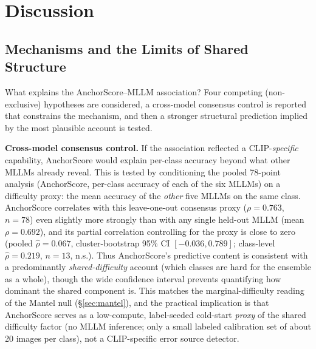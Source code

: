 \documentclass[11pt,a4paper]{article}
\begin{document}
\section{Discussion}
\label{sec:discussion}

\subsection{Mechanisms and the Limits of Shared Structure}
\label{sec:consensus_control}
\label{sec:mechanisms}

What explains the AnchorScore--MLLM association? Four competing (non-exclusive) hypotheses are considered, a cross-model consensus control is reported that constrains the mechanism, and then a stronger structural prediction implied by the most plausible account is tested.

\textbf{Cross-model consensus control.} If the association reflected a CLIP-\emph{specific} capability, AnchorScore would explain per-class accuracy beyond what other MLLMs already reveal. This is tested by conditioning the pooled 78-point analysis (AnchorScore, per-class accuracy of each of the six MLLMs) on a difficulty proxy: the mean accuracy of the \emph{other} five MLLMs on the same class. AnchorScore correlates with this leave-one-out consensus proxy ($\rho=0.763$, $n=78$) even slightly more strongly than with any single held-out MLLM (mean $\rho=0.692$), and its partial correlation controlling for the proxy is close to zero (pooled $\hat{\rho}=0.067$, cluster-bootstrap 95\% CI $[-0.036,0.789]$; class-level $\hat{\rho}=0.219$, $n=13$, n.s.). Thus AnchorScore's predictive content is consistent with a predominantly \emph{shared-difficulty} account (which classes are hard for the ensemble as a whole), though the wide confidence interval prevents quantifying how dominant the shared component is. This matches the marginal-difficulty reading of the Mantel null (\S\ref{sec:mantel}), and the practical implication is that AnchorScore serves as a low-compute, label-seeded cold-start \emph{proxy} of the shared difficulty factor (no MLLM inference; only a small labeled calibration set of about 20 images per class), not a CLIP-specific error source detector.
\end{document}
